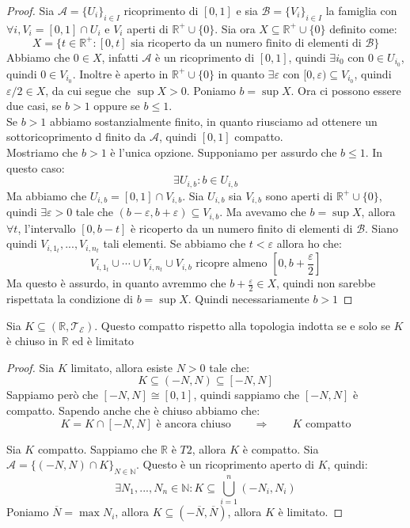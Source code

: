 \documentclass[11pt,a4paper,twoside]{article}
\newcommand{\vareps}{\varepsilon}
\theoremstyle{definition}
\begin{document}
\begin{proof}
	Sia $\mathcal A = \{U_i\}_{i \in I}$ ricoprimento di $[0,1]$ e sia $\mathcal B = \{V_i\}_{i \in I}$ la famiglia con $\forall i, V_i = [0,1] \cap U_i$ e $V_i$ aperti di $\mathbb R^+ \cup \{0\}$. Sia ora $X\subseteq\mathbb R^+ \cup \{0\}$ definito come:
	\[ X =\{ t \in \mathbb R^+ : [0, t]\text{ sia ricoperto da un numero finito di elementi di }\mathcal B \} \]
	Abbiamo che $0 \in X$, infatti $\mathcal A$ è un ricoprimento di $[0,1]$, quindi $\exists i_0$ con $0 \in U_{i_0}$, quindi $0 \in V_{i_0}$. Inoltre è aperto in $\mathbb R^+ \cup \{0\}$ in quanto $\exists \vareps$ con $[0,\vareps)\subseteq V_{i_0}$, quindi $\vareps/2 \in X$, da cui segue che $\sup X>0$. Poniamo $b = \sup X$. Ora ci possono essere due casi, se $b >1$ oppure se $b\leq 1$.\\
	Se $b>1$ abbiamo sostanzialmente finito, in quanto riusciamo ad ottenere un sottoricoprimento d finito da $\mathcal A$, quindi $[0,1]$ compatto.\\
	Mostriamo che $b>1$ è l'unica opzione. Supponiamo per assurdo che $b \leq 1$. In questo caso:
	\[\exists U_{i,b} : b \in U_{i,b}\]
	Ma abbiamo che $U_{i,b} = [0,1] \cap V_{i,b}$. Sia $U_{i,b}$ sia $V_{i,b}$ sono aperti di $\mathbb R^+ \cup \{0\}$, quindi $\exists \vareps >0$ tale che $(b-\vareps, b + \vareps) \subseteq V_{i,b}$. Ma avevamo che $b = \sup X$, allora $\forall t$, l'intervallo $[0, b-t]$ è ricoperto da un numero finito di elementi di $\mathcal B$. Siano quindi $V_{i,1_t},...,V_{i,n_t}$ tali elementi.
	Se abbiamo che $t<\vareps$ allora ho che:
	\[ V_{i,1_t} \cup \cdots \cup V_{i,n_t} \cup V_{i,b} \text{ ricopre almeno }\left[0, b + \frac \vareps 2 \right]\]
	Ma questo è assurdo, in quanto avremmo che $b + \frac\vareps 2 \in X$, quindi non sarebbe rispettata la condizione di $b = \sup X$. Quindi necessariamente $b>1$
\end{proof}

\begin{prop}{}{}
	Sia $K\subseteq(\mathbb R, \mathcal T_\mathcal E)$. Questo compatto rispetto alla topologia indotta se e solo se $K$ è chiuso in $\mathbb R$ ed è limitato
\end{prop}

\begin{proof}
	\fbox{$\Leftarrow$} Sia $K$ limitato, allora esiste $N>0$ tale che:
	\[ K \subseteq (-N, N) \subseteq [-N, N] \]
	Sappiamo però che $[-N, N] \cong [0,1]$, quindi sappiamo che $[-N, N]$ è compatto. Sapendo anche che è chiuso abbiamo che:
	\[ K = K \cap [-N, N]\text{ è ancora chiuso}\qquad \Rightarrow \qquad K \text{ compatto} \]

	\fbox{$\Rightarrow$} Sia $K$ compatto. Sappiamo che $\mathbb R$ è $T2$, allora $K$ è compatto. Sia $\mathcal A = \{(-N, N) \cap K\}_{N \in \mathbb N}$. Questo è un ricoprimento aperto di $K$, quindi:
	\[\exists N_1,...,N_n \in \mathbb N : K \subseteq \bigcup_{i = 1}^n(-N_i, N_i)\]
	Poniamo $\overline N = \max N_i$, allora $K \subseteq (-\overline N, \overline N)$, allora $K$ è limitato.
\end{proof}
\end{document}
